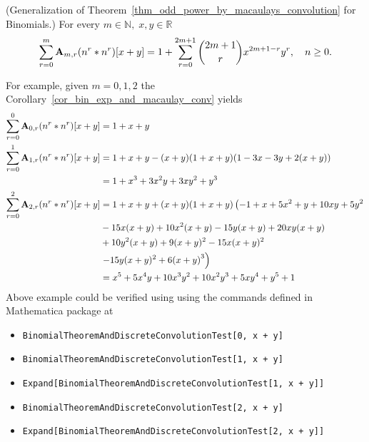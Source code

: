 \begin{cor}
    \label{cor_bin_exp_and_macaulay_conv}
    (Generalization of Theorem~\ref{thm_odd_power_by_macaulays_convolution} for Binomials.)
    For every $m\in\mathbb{N}, \; x,y\in\mathbb{R}$
    \begin{equation*}
        \sum_{r=0}^{m} {\mathbf{A}} \sb{m,r} (n \sp{r} \ast n \sp{r}) [x+y]
        =
        1 + \sum_{r=0}^{2m+1} \binom{2m+1}{r} x^{2m+1-r} y^r, \quad n\geq 0.
    \end{equation*}
\end{cor}
For example, given $m=0,1,2$ the Corollary~\ref{cor_bin_exp_and_macaulay_conv} yields
\begin{equation*}
    \begin{split}
        \sum_{r=0}^{0} {\mathbf{A}} \sb{0,r} (n \sp{r} \ast n \sp{r}) [x+y]
        &= 1 + x + y \\
        \sum_{r=0}^{1} {\mathbf{A}} \sb{1,r} (n \sp{r} \ast n \sp{r}) [x+y]
        &= 1 + x + y - (x + y) (1 + x + y) (1 - 3 x - 3 y + 2 (x + y)) \\
        &= 1 + x^3 + 3 x^2 y + 3 x y^2 + y^3\\
        \sum_{r=0}^{2} {\mathbf{A}} \sb{2,r} (n \sp{r} \ast n \sp{r}) [x+y]
        &=1 + x + y + (x + y) (1 + x + y) \left(-1 + x + 5 x^2 + y + 10 x y + 5 y^2\right. \\
        &-15 x (x + y) + 10 x^2 (x + y) - 15 y (x + y) + 20 x y (x + y) \\
        &+ 10 y^2 (x + y) +9 (x + y)^2 - 15 x (x + y)^2 \\
        &\left.-15 y (x + y)^{2} + 6 {(x + y)}^{3}\right) \\
        &=x^5 + 5 x^4 y + 10 x^3 y^2 + 10 x^2 y^3 + 5 x y^4 + y^5 + 1
    \end{split}
\end{equation*}
Above example could be verified using using the commands defined in Mathematica package at~\cite{PK22Source}
\begin{itemize}
    \item \texttt{BinomialTheoremAndDiscreteConvolutionTest[0, x + y]}
    \item \texttt{BinomialTheoremAndDiscreteConvolutionTest[1, x + y]}
    \item \texttt{Expand[BinomialTheoremAndDiscreteConvolutionTest[1, x + y]]}
    \item \texttt{BinomialTheoremAndDiscreteConvolutionTest[2, x + y]}
    \item \texttt{Expand[BinomialTheoremAndDiscreteConvolutionTest[2, x + y]]}
\end{itemize}
